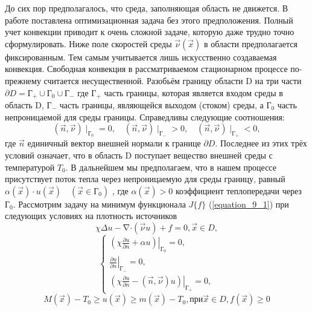 До сих пор предполагалось, что среда, заполняющая область не движется. В работе \cite{literature_brusencev_2013} поставлена оптимизационная задача без этого предположения. Полный учет конвекции приводит к очень сложной задаче, которую даже трудно точно сформулировать. Ниже поле скоростей среды $\vec{\nu}(\vec x)$ в области предполагается фиксированным. Тем самым учитывается лишь искусственно создаваемая конвекция. Свободная конвекция в рассматриваемом стационарном процессе по-прежнему считается несущественной. Разобьём границу области D на три части $\partial D{=}\text{Г}_+{\cup}\text{Г}_0{\cup}\text{Г}_-$ где $\text{Г}_+$ часть границы, которая является входом среды в область D, $\text{Г}_-$ часть границы, являющейся выходом (стоком) среды, а $Г_0$ часть непроницаемой для среды границы. Справедливы следующие соотношения:\[(\vec{n},\vec{\nu}){\mid}_{\text{Г}_0}=0,\quad (\vec{n},\vec{\nu}){\mid}_{\text{Г}_-}>0,\quad (\vec n,\vec{\nu}){\mid}_{\text{Г}_+}<0,\]
где $\vec n$ единичный вектор внешней нормали к границе $\partial D$. Последнее из этих трёх условий означает, что в область D поступает вещество внешней среды с температурой $T_0$. В дальнейшем мы предполагаем, что в нашем процессе присутствует поток тепла через непроницаемую для среды границу, равный $\alpha(\vec x){\cdot}u(\vec x)\quad(\vec x{\in}\text{Г}_0)$ , где $\alpha(\vec x){>}0$ коэффициент теплопередачи через $\text{Г}_0$. Рассмотрим задачу на минимум функционала $J\{f\}$ (\ref{equation_9_1}) при следующих условиях на плотность источников
 		\begin{equation} \label{equation_9_8}
        \chi\Delta u-\mathop{\nabla}\cdot(\vec\nu u)+f=0, \vec x\in D,
        \end{equation}
        \begin{equation}\label{equation_9_9}
        \begin{cases}
        \displaystyle\left.\left( \chi\frac{\partial u}{\partial n}+\alpha u\right)\right|_{\text{Г}_0}=0,\\
        \displaystyle\left.\frac{\partial u}{\partial n}\right|_{\text{Г}_-}=0,\\
        \displaystyle\left.\left( \chi\frac{\partial u}{\partial n}-(\vec n,\vec\nu)u\right)\right|_{\text{Г}_+}=0,
        \end{cases}
        \end{equation}
        \begin{equation} \label{equation_9_10}
        M(\vec x)-T_0\ge u(\vec x)\ge m(\vec x)-T_0,при \vec x\in D,f(\vec x)\ge 0
        \end{equation}
